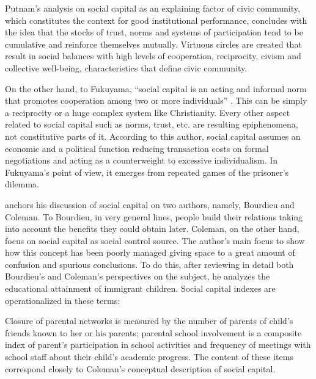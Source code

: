 \documentclass[a4paper, 12pt, openright, oneside, article, german, french, brazil, english]{abntex2}
\begin{document}
\begin{citacao}
	Putnam's analysis on social capital as an explaining factor of civic community, which constitutes the context for good institutional performance, concludes with the idea that the stocks of trust, norms and systems of participation tend to be cumulative and reinforce themselves mutually. Virtuous circles are created that result in social balances with high levels of cooperation, reciprocity, civism and collective well-being, characteristics that define civic community. \cite[p. 67]{higgins2005fundamentos}
\end{citacao}

On the other hand, to Fukuyama, ``social capital is an acting and informal norm that promotes cooperation among two or more individuals'' \cite[p. 67]{higgins2005fundamentos}. This can be simply a reciprocity or a huge complex system like Christianity. Every other aspect related to social capital such as norms, trust, etc. are resulting epiphenomena, not constitutive parts of it. According to this author, social capital assumes an economic and a political function reducing transaction costs on formal negotiations and acting as a counterweight to excessive individualism. In Fukuyama's point of view, it emerges from repeated games of the prisoner's dilemma.

 anchors his discussion of social capital on two authors, namely, Bourdieu and Coleman. To Bourdieu, in very general lines, people build their relations taking into account the benefits they could obtain later. Coleman, on the other hand, focus on social capital as social control source.  The author's main focus to show how this concept has been poorly managed giving space to a great amount of confusion and spurious conclusions. To do this, after reviewing in detail both Bourdieu's and Coleman's perspectives on the subject, he analyzes the educational attainment of immigrant children. Social capital indexes are operationalized in these terms:

\begin{citacao}
	Closure of parental networks is measured by the number of parents of child's friends known to her or his parents; parental school involvement is a composite index of parent's participation in school activities and frequency of meetings with school staff about their child's academic progress. The content of these items correspond closely to Coleman's conceptual description of social capital. \cite[p. 7]{portes2000two}
\end{citacao}
\end{document}
